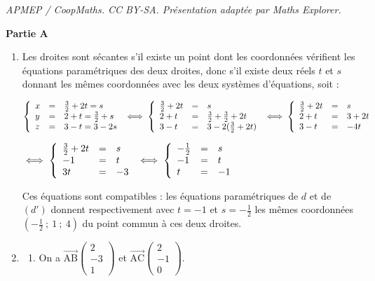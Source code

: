 \documentclass[10pt]{article}
\providecommand{\vect}[1]{\overrightarrow{#1}}
\begin{document}
\noindent\textit{APMEP / CoopMaths. CC BY-SA. Présentation adaptée par Maths Explorer.}\par\medskip
\medskip

\begin{center}\textbf{Partie A} \end{center}

\smallskip

\begin{enumerate}
\item Les droites sont sécantes s'il existe un point dont les coordonnées vérifient les équations paramétriques des deux droites, donc s'il existe deux réels $t$ et $s$ donnant les mêmes coordonnées avec les deux systèmes d'équations, soit :

$\left\{\begin{array}{l c l}
x& =& \frac 32 + 2t = s\\
y&=&2 +t = \frac 32 + s\\
z&=&3 - t = 3 - 2s
\end{array}\right.\iff 
\left\{\begin{array}{l c l}
\frac 32 + 2t& =& s\\
2 +t &=& \frac 32 + \frac 32 + 2t\\
3 - t &=& 3 - 2(\frac 32 + 2t)
\end{array}\right. \iff \left\{\begin{array}{l c l}
\frac 32 + 2t& =& s\\
2 + t&=&3 + 2t\\
3 - t&=&- 4t\end{array}\right. $

$\iff \left\{\begin{array}{l c l} 
\frac 32 + 2t& =& s\\
- 1&=&t\\
3t&=&-3\end{array}\right. \iff \left\{\begin{array}{l c l} -\frac 12 & =& s\\
- 1&=&t\\
t&=&-1\end{array}\right.$

Ces équations sont compatibles : les équations paramétriques de $d$ et de $(d')$ donnent respectivement  avec $t = - 1$ et $s = -\frac 12$ les mêmes coordonnées $\left(- \frac12~;~1~;~4 \right)$ du point commun à ces deux droites.
\item
	\begin{enumerate}
		\item On a $\vect{\text{AB}}\begin{pmatrix}2\\-3\\1\end{pmatrix}$ et $\vect{\text{AC}}\begin{pmatrix}2\\-1\\0\end{pmatrix}$.


\end{enumerate}
\end{enumerate}
\end{document}

